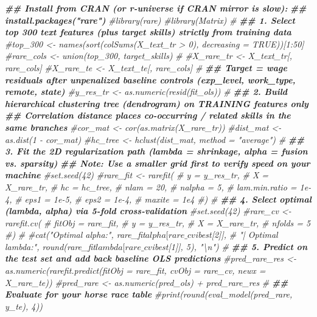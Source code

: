 \documentclass[
]{article}
\newenvironment{Shaded}{\begin{snugshade}}{\end{snugshade}}
\newcommand{\CommentTok}[1]{\textcolor[rgb]{0.56,0.35,0.01}{\textit{#1}}}
\newcommand{\DocumentationTok}[1]{\textcolor[rgb]{0.56,0.35,0.01}{\textbf{\textit{#1}}}}
\begin{document}
\begin{Shaded}
\begin{Highlighting}[]
\DocumentationTok{\#\# Install from CRAN (or r{-}universe if CRAN mirror is slow):}
\DocumentationTok{\#\# install.packages("rare")}
\CommentTok{\#library(rare)}
\CommentTok{\#library(Matrix)}
\CommentTok{\#}
\DocumentationTok{\#\# 1. Select top 300 text features (plus target skills) strictly from training data}
\CommentTok{\#top\_300   \textless{}{-} names(sort(colSums(X\_text\_tr \textgreater{} 0), decreasing = TRUE))[1:50]}
\CommentTok{\#rare\_cols \textless{}{-} union(top\_300, target\_skills)}
\CommentTok{\#}
\CommentTok{\#X\_rare\_tr \textless{}{-} X\_text\_tr[, rare\_cols]}
\CommentTok{\#X\_rare\_te \textless{}{-} X\_text\_te[, rare\_cols]}
\CommentTok{\#}
\DocumentationTok{\#\# Target = wage residuals after unpenalized baseline controls (exp\_level, work\_type, remote, state)}
\CommentTok{\#y\_res\_tr \textless{}{-} as.numeric(resid(fit\_ols))}
\CommentTok{\#}
\DocumentationTok{\#\# 2. Build hierarchical clustering tree (dendrogram) on TRAINING features only}
\DocumentationTok{\#\# Correlation distance places co{-}occurring / related skills in the same branches}
\CommentTok{\#cor\_mat  \textless{}{-} cor(as.matrix(X\_rare\_tr))}
\CommentTok{\#dist\_mat \textless{}{-} as.dist(1 {-} cor\_mat)}
\CommentTok{\#hc\_tree  \textless{}{-} hclust(dist\_mat, method = "average")}
\CommentTok{\#}
\DocumentationTok{\#\# 3. Fit the 2D regularization path (lambda = shrinkage, alpha = fusion vs. sparsity)}
\DocumentationTok{\#\# Note: Use a smaller grid first to verify speed on your machine}
\CommentTok{\#set.seed(42)}
\CommentTok{\#rare\_fit \textless{}{-} rarefit(}
\CommentTok{\#  y             = y\_res\_tr,}
\CommentTok{\#  X             = X\_rare\_tr,}
\CommentTok{\#  hc            = hc\_tree,}
\CommentTok{\#  nlam          = 20,}
\CommentTok{\#  nalpha        = 5,}
\CommentTok{\#  lam.min.ratio = 1e{-}4,}
\CommentTok{\#  eps1          = 1e{-}5,}
\CommentTok{\#  eps2          = 1e{-}4,}
\CommentTok{\#  maxite        = 1e4}
\CommentTok{\#)}
\CommentTok{\#}
\DocumentationTok{\#\# 4. Select optimal (lambda, alpha) via 5{-}fold cross{-}validation}
\CommentTok{\#set.seed(42)}
\CommentTok{\#rare\_cv \textless{}{-} rarefit.cv(}
\CommentTok{\#  fitObj = rare\_fit,}
\CommentTok{\#  y      = y\_res\_tr,}
\CommentTok{\#  X      = X\_rare\_tr,}
\CommentTok{\#  nfolds = 5}
\CommentTok{\#)}
\CommentTok{\#}
\CommentTok{\#cat("Optimal alpha:", rare\_fit$alpha[rare\_cv$ibest[2]],}
\CommentTok{\#    "| Optimal lambda:", round(rare\_fit$lambda[rare\_cv$ibest[1]], 5), "\textbackslash{}n")}
\CommentTok{\#}
\DocumentationTok{\#\# 5. Predict on the test set and add back baseline OLS predictions}
\CommentTok{\#pred\_rare\_res \textless{}{-} as.numeric(rarefit.predict(fitObj = rare\_fit, cvObj = rare\_cv, newx = X\_rare\_te))}
\CommentTok{\#pred\_rare     \textless{}{-} as.numeric(pred\_ols) + pred\_rare\_res}
\CommentTok{\#}
\DocumentationTok{\#\# Evaluate for your horse race table}
\CommentTok{\#print(round(eval\_model(pred\_rare, y\_te), 4))}
\end{Highlighting}
\end{Shaded}
\end{document}
